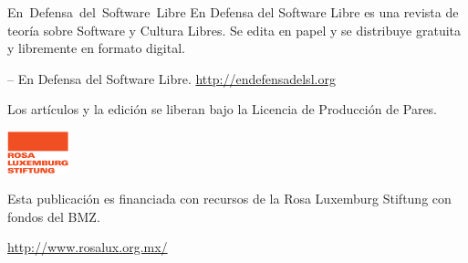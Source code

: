     \newpage
    \thispagestyle{empty}

    \begin{flushleft}\hbox{\Large{En Defensa del Software Libre}}
    En Defensa del Software Libre es una revista de teoría sobre Software y Cultura
    Libres. Se edita en papel y se distribuye gratuita y libremente en formato
    digital.

    \vfill
    \copyleft  \the\year -- En Defensa del Software Libre.
    \url{http://endefensadelsl.org}

    Los artículos y la edición se liberan bajo la Licencia de Producción
    de Pares.

    \includegraphics[width=50pt]{images/LOGO-RLS-A-CMYK.eps}

    Esta publicación es financiada con recursos de la Rosa Luxemburg
    Stiftung con fondos del BMZ.

    \url{http://www.rosalux.org.mx/}

    \end{flushleft}
   \newpage

